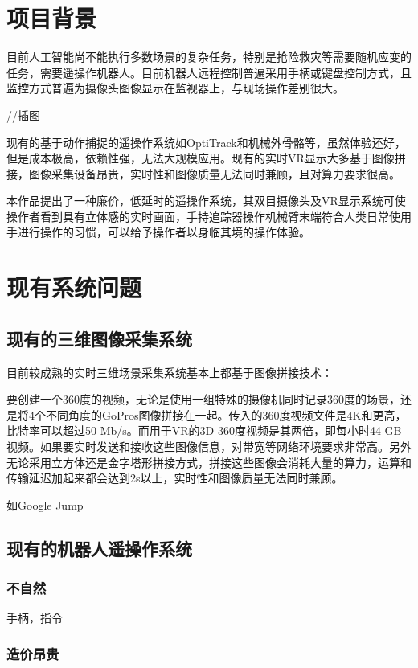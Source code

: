 \chapter{项目背景}

目前人工智能尚不能执行多数场景的复杂任务，特别是抢险救灾等需要随机应变的任务，需要遥操作机器人。目前机器人远程控制普遍采用手柄或键盘控制方式，且监控方式普遍为摄像头图像显示在监视器上，与现场操作差别很大。

//插图

现有的基于动作捕捉的遥操作系统如OptiTrack和机械外骨骼等，虽然体验还好，但是成本极高，依赖性强，无法大规模应用。现有的实时VR显示大多基于图像拼接，图像采集设备昂贵，实时性和图像质量无法同时兼顾，且对算力要求很高。

本作品提出了一种廉价，低延时的遥操作系统，其双目摄像头及VR显示系统可使操作者看到具有立体感的实时画面，手持追踪器操作机械臂末端符合人类日常使用手进行操作的习惯，可以给予操作者以身临其境的操作体验。




\chapter{现有系统问题}

\section{现有的三维图像采集系统}
目前较成熟的实时三维场景采集系统基本上都基于图像拼接技术：

要创建一个360度的视频，无论是使用一组特殊的摄像机同时记录360度的场景，还是将4个不同角度的GoPros图像拼接在一起。传入的360度视频文件是4K和更高，比特率可以超过50 Mb/s。而用于VR的3D 360度视频是其两倍，即每小时44 GB视频。如果要实时发送和接收这些图像信息，对带宽等网络环境要求非常高。另外无论采用立方体还是金字塔形拼接方式，拼接这些图像会消耗大量的算力，运算和传输延迟加起来都会达到2s以上，实时性和图像质量无法同时兼顾。

如Google Jump


\section{现有的机器人遥操作系统}
\subsection{不自然}
手柄，指令
\subsection{造价昂贵}

